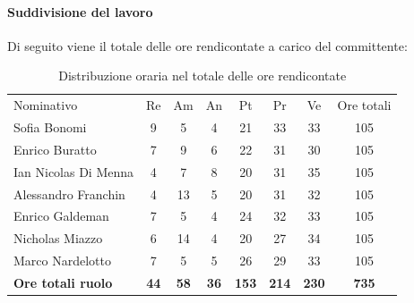 \documentclass[../piano-di-progetto.tex]{subfiles}
\begin{document}
    \paragraph{Suddivisione del lavoro}
    Di seguito viene il totale delle ore rendicontate a carico del committente:
    \begin{table}[H]
      \centering
      \begin{tabular}{lccccccc}
        Nominativo                & Re          & Am          & An          & Pt           & Pr           & Ve           & Ore totali   \\
        Sofia Bonomi              & 9           & 5           & 4           & 21           & 33           & 33           & 105          \\
        Enrico Buratto            & 7           & 9           & 6           & 22           & 31           & 30           & 105          \\
        Ian Nicolas Di Menna      & 4           & 7           & 8           & 20           & 31           & 35           & 105          \\
        Alessandro Franchin       & 4           & 13          & 5           & 20           & 31           & 32           & 105          \\
        Enrico Galdeman           & 7           & 5           & 4           & 24           & 32           & 33           & 105          \\
        Nicholas Miazzo           & 6           & 14          & 4           & 20           & 27           & 34           & 105          \\
        Marco Nardelotto          & 7           & 5           & 5           & 26           & 29           & 33           & 105          \\
        \textbf{Ore totali ruolo} & \textbf{44} & \textbf{58} & \textbf{36} & \textbf{153} & \textbf{214} & \textbf{230} & \textbf{735}
      \end{tabular}
      \caption{Distribuzione oraria nel totale delle ore rendicontate}
      \end{table}
  
\end{document}
